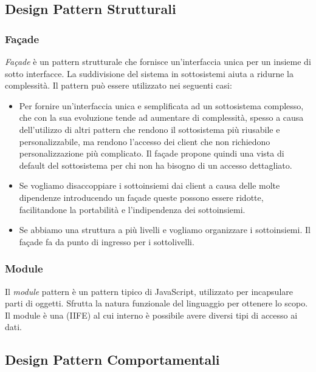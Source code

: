 \subsection{Design Pattern Strutturali}

\subsubsection{Fa\c{c}ade}
\textit{Fa\c{c}ade} è un pattern strutturale che fornisce un’interfaccia unica per un insieme di sotto interfacce. La suddivisione del sistema in sottosistemi aiuta a ridurne la complessità.
Il pattern può essere utilizzato nei seguenti casi:
\begin{itemize}
	\item Per fornire un’interfaccia unica e semplificata ad un sottosistema complesso, che con la sua evoluzione tende ad aumentare di complessità, spesso a causa dell’utilizzo di altri pattern che rendono il sottosistema più riusabile e personalizzabile, ma rendono l’accesso dei client che non richiedono personalizzazione più complicato. Il fa\c{c}ade propone quindi una vista di default del sottosistema per chi non ha bisogno di un accesso dettagliato.
	\item Se vogliamo disaccoppiare i sottoinsiemi dai client a causa delle molte dipendenze introducendo un fa\c{c}ade queste possono essere ridotte, facilitandone la portabilità e l’indipendenza dei sottoinsiemi.
	\item Se abbiamo una struttura a più livelli e vogliamo organizzare i sottoinsiemi. Il fa\c{c}ade fa da punto di ingresso per i sottolivelli.
\end{itemize}

\subsubsection{Module}
Il \textit{module} pattern è un pattern tipico di JavaScript, utilizzato per incapsulare parti di oggetti.
Sfrutta la natura funzionale del linguaggio per ottenere lo scopo. Il module è una  (IIFE) al cui interno è possibile avere diversi tipi di accesso ai dati.

\subsection{Design Pattern Comportamentali}

